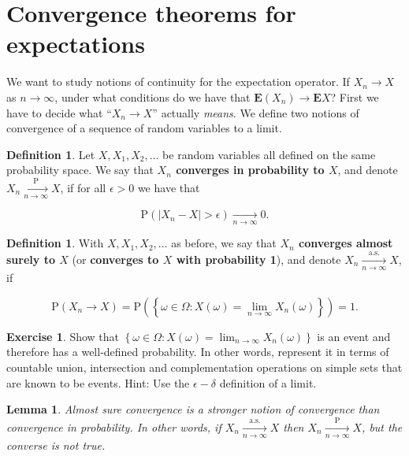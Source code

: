 \documentclass[11pt]{report}
\theoremstyle{plain}
\newtheorem{lem}[thm]{Lemma}
\theoremstyle{definition}
\newtheorem{defn}[thm]{Definition}
\newtheorem{xexercise}[thm]{Exercise}
\begin{document}
\section{Convergence theorems for expectations}

We want to study notions of continuity for the
expectation operator. If $X_n\to X$ as $n\to\infty$,
under what conditions do we have that
$\mathbf{E}(X_n)\to \mathbf{E} X$? First we have to
decide what ``$X_n\to X$'' actually \emph{means}. We
define two notions of convergence of a sequence of
random variables to a limit.

\begin{defn}
Let $X, X_1, X_2, \ldots$ be random variables all
defined on the same probability space. We say that
\textbf{$X_n$ converges in probability to $X$}, and denote
$X_n \xrightarrow[n\to\infty]{\mathrm{P}} X$, if for
all $\epsilon>0$ we have that

\[
\mathrm{P}(|X_n-X|>\epsilon) \xrightarrow[n\to\infty]{} 0.
\]

\end{defn}

\begin{defn}
With $X,X_1,X_2,\ldots$ as before, we say that \textbf{$X_n$
converges almost surely to $X$} (or \textbf{converges to $X$
with probability 1}), and denote
$X_n \xrightarrow[n\to\infty]{\textrm{a.s.}} X$, if

\[
\mathrm{P}( X_n \to X ) = \mathrm{P}\left(\left\{ \omega \in \Omega : X(\omega)=\lim_{n\to\infty} X_n(\omega) \right\} \right) = 1.
\]

\end{defn}

\begin{xexercise}
Show that
$\left\{ \omega \in \Omega :
X(\omega)=\lim_{n\to\infty} X_n(\omega) \right\}$
is an event and therefore has a well-defined
probability. In other words, represent it in terms of
countable union, intersection and complementation
operations on simple sets that are known to be events.
Hint: Use the $\epsilon-\delta$ definition of a
limit.
\end{xexercise}

\begin{lem}
\label{lem-convergence-types}
Almost sure convergence is a stronger notion of
convergence than convergence in probability. In other
words, if
$X_n\xrightarrow[n\to\infty]{\textrm{a.s.}} X$ then
$X_n\xrightarrow[n\to\infty]{\mathrm{P}} X$, but the
converse is not true.
\end{lem}
\end{document}
